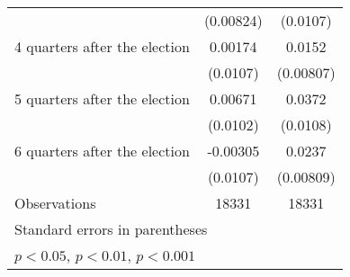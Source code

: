 \begin{table}[htbp]
\begin{tabular}{l*{2}{c}}
                    &   (0.00824)         &    (0.0107)         \\
[1em]
 4 quarters after the election&     0.00174         &      0.0152         \\
                    &    (0.0107)         &   (0.00807)         \\
[1em]
 5 quarters after the election&     0.00671         &      0.0372\sym{***}\\
                    &    (0.0102)         &    (0.0108)         \\
[1em]
 6 quarters after the election&    -0.00305         &      0.0237\sym{**} \\
                    &    (0.0107)         &   (0.00809)         \\
\hline
Observations        &       18331         &       18331         \\
\hline\hline
\multicolumn{3}{l}{\footnotesize Standard errors in parentheses}\\
\multicolumn{3}{l}{\footnotesize \sym{*} \(p<0.05\), \sym{**} \(p<0.01\), \sym{***} \(p<0.001\)}\\
\end{tabular}
\end{table}

